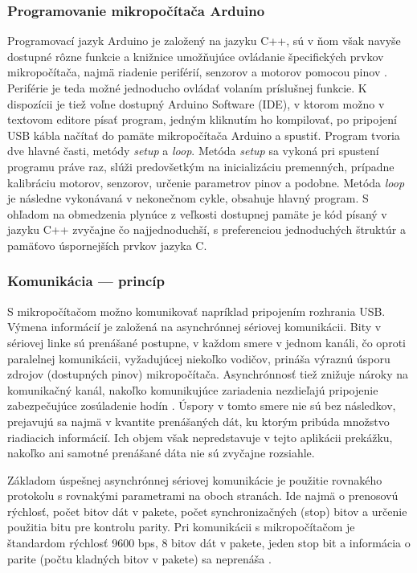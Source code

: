 \subsubsection{Programovanie mikropočítača Arduino}
Programovací jazyk Arduino je založený na jazyku C++, sú v ňom však navyše dostupné rôzne funkcie a knižnice umožňujúce ovládanie špecifických prvkov mikropočítača, najmä riadenie periférií, senzorov a motorov pomocou pinov \cite{ArduinoLanguage}. Periférie je teda možné jednoducho ovládať volaním príslušnej funkcie. K dispozícii je tiež voľne dostupný Arduino Software (IDE), v ktorom možno v textovom editore písať program, jedným kliknutím ho kompilovať, po pripojení USB kábla načítať do pamäte mikropočítača Arduino a spustiť. Program tvoria dve hlavné časti, metódy \textit{setup} a \textit{loop}. Metóda \textit{setup} sa vykoná pri spustení programu práve raz, slúži predovšetkým na inicializáciu premenných, prípadne kalibráciu motorov, senzorov, určenie parametrov pinov a podobne. Metóda \textit{loop} je následne vykonávaná v nekonečnom cykle, obsahuje hlavný program. S ohľadom na obmedzenia plynúce z veľkosti dostupnej pamäte je kód písaný v jazyku C++ zvyčajne čo najjednoduchší, s preferenciou jednoduchých štruktúr a pamäťovo úspornejších prvkov jazyka C.

\subsubsection{Komunikácia --- princíp}
S mikropočítačom možno komunikovať napríklad pripojením rozhrania USB. Výmena informácií je založená na asynchrónnej sériovej komunikácii. Bity v sériovej linke sú prenášané postupne, v každom smere v jednom kanáli, čo oproti paralelnej komunikácii, vyžadujúcej niekoľko vodičov, prináša výraznú úsporu zdrojov (dostupných pinov) mikropočítača. Asynchrónnosť tiež znižuje nároky na komunikačný kanál, nakoľko komunikujúce zariadenia nezdieľajú pripojenie zabezpečujúce zosúladenie hodín \cite{serialCommunication}. Úspory v tomto smere nie sú bez následkov, prejavujú sa najmä v kvantite prenášaných dát, ku ktorým pribúda množstvo riadiacich informácií. Ich objem však nepredstavuje v tejto aplikácii prekážku, nakoľko ani samotné prenášané dáta nie sú zvyčajne rozsiahle.

Základom úspešnej asynchrónnej sériovej komunikácie je použitie rovnakého protokolu s rovnakými parametrami na oboch stranách. Ide najmä o prenosovú rýchlosť, počet bitov dát v pakete, počet synchronizačných (stop) bitov a určenie použitia bitu pre kontrolu parity. Pri komunikácii s mikropočítačom je štandardom rýchlosť 9600 bps, 8 bitov dát v pakete, jeden stop bit a informácia o parite (počtu kladných bitov v pakete) sa neprenáša \cite{serialCommunicationParameters}.

